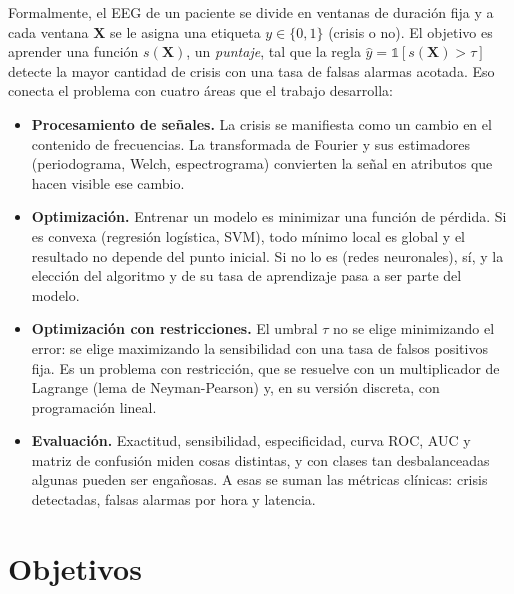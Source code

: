 Formalmente, el EEG de un paciente se divide en ventanas de duración fija y a cada ventana $\mathbf{X}$ se le asigna una
etiqueta $y \in \{0, 1\}$ (crisis o no). El objetivo es aprender una función $s(\mathbf{X})$, un \emph{puntaje}, tal que
la regla $\hat y = \mathds{1}[s(\mathbf{X}) > \tau]$ detecte la mayor cantidad de crisis con una tasa de falsas alarmas
acotada. Eso conecta el problema con cuatro áreas que el trabajo desarrolla:
\begin{itemize}
  \item \textbf{Procesamiento de señales.} La crisis se manifiesta como un cambio en el contenido de frecuencias. La
        transformada de Fourier y sus estimadores (periodograma, Welch, espectrograma) convierten la señal en atributos
        que hacen visible ese cambio.
  \item \textbf{Optimización.} Entrenar un modelo es minimizar una función de pérdida. Si es convexa (regresión logística,
        SVM), todo mínimo local es global y el resultado no depende del punto inicial. Si no lo es (redes neuronales), sí,
        y la elección del algoritmo y de su tasa de aprendizaje pasa a ser parte del modelo.
  \item \textbf{Optimización con restricciones.} El umbral $\tau$ no se elige minimizando el error: se elige maximizando la
        sensibilidad con una tasa de falsos positivos fija. Es un problema con restricción, que se resuelve con un
        multiplicador de Lagrange (lema de Neyman-Pearson) y, en su versión discreta, con programación lineal.
  \item \textbf{Evaluación.} Exactitud, sensibilidad, especificidad, curva ROC, AUC y matriz de confusión miden cosas
        distintas, y con clases tan desbalanceadas algunas pueden ser engañosas. A esas se suman las métricas clínicas:
        crisis detectadas, falsas alarmas por hora y latencia.
\end{itemize}

\section{Objetivos}

